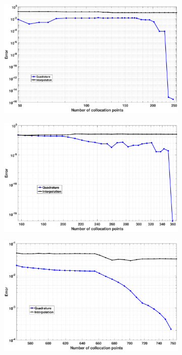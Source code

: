 \documentclass[11pt]{article}
\begin{document}
\FloatBarrier
\begin{figure}[htb]
	\centering %
	\begin{subfigure}{0.6\textwidth}
		\includegraphics[width=\linewidth]{./case_N_2.eps}
		\caption{}
		\label{fig:1}
	\end{subfigure}\hfil %
	\begin{subfigure}{0.6\textwidth}
		\includegraphics[width=\linewidth]{./case_N_4.eps}
		\caption{}
		\label{fig:2}
	\end{subfigure}\hfil %
	\begin{subfigure}{0.6\textwidth}
		\includegraphics[width=\linewidth]{./case_N_8.eps}

\end{subfigure}
\end{figure}
\end{document}
